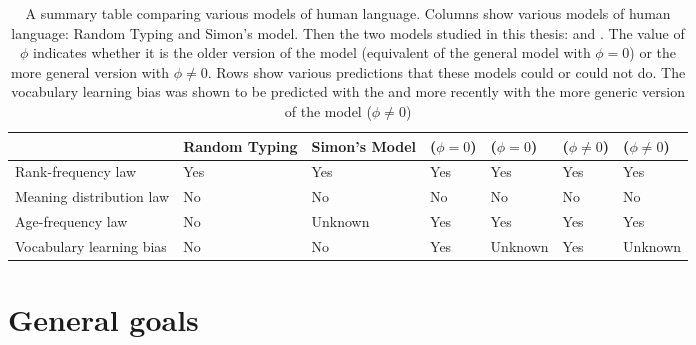 \begin{table}
  \centering
  \begin{adjustbox}{max width=\textwidth}
    \begin{tabular}{p{2.5cm}p{1.5cm}p{1.5cm}p{1.5cm}p{1.5cm}p{1.5cm}p{1.5cm}}
      \toprule
                               & Random Typing & Simon's Model        & \Firstmodel{} ($\phi=0$) & \Secondmodel{} ($\phi=0$) & \Firstmodel{} ($\phi\neq 0$) & \Secondmodel{} ($\phi\neq 0$) \\
      \midrule
      Rank-frequency law       &      Yes      &      Yes             &             Yes          &           Yes             &           Yes                &           Yes                 \\
      \addlinespace
      Meaning distribution law &      No       &      No              &             No           &           No              &           No                 &           No                  \\
      \addlinespace
      Age-frequency law        &      No       &    Unknown           &             Yes          &           Yes             &           Yes                &           Yes                 \\
      \addlinespace
      Vocabulary learning bias &      No       &      No              &  Yes \cite{Ferrer2017a}  &         Unknown           &  Yes \cite{Carrera2021a}     &         Unknown               \\
      \bottomrule
    \end{tabular}
  \end{adjustbox}
\caption{
    A summary table comparing various models of human language.
    Columns show various models of human language: Random Typing and Simon's model.
    Then the two models studied in this thesis: \firstm{} and \secondmodel{}.
    The value of $\phi$ indicates whether it is the older version of the model (equivalent of the general model with $\phi=0$) or the more general version with $\phi \neq 0$.
    Rows show various predictions that these models could or could not do.
    The vocabulary learning bias was shown to be predicted with the \firstmodel{} and more recently with the more generic version of the model ($\phi \neq 0$)
  }
  \label{tab:comparison_models}
\end{table}

\section{General goals}
\label{sec:introduction_general-goals}

